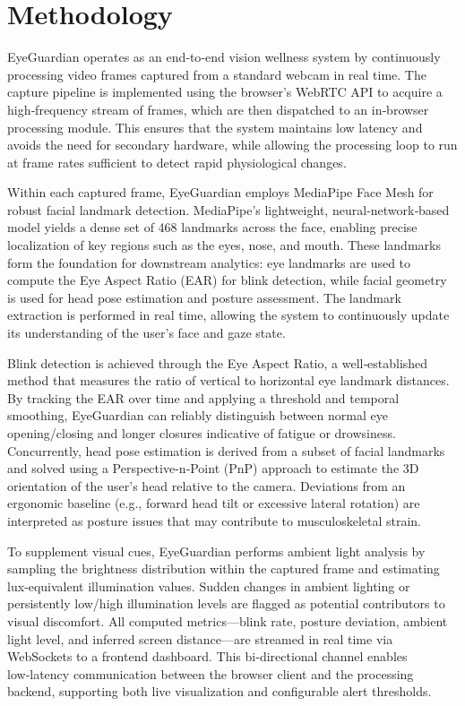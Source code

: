 \documentclass[12pt]{report}
\begin{document}
\section{Methodology}

EyeGuardian operates as an end‑to‑end vision wellness system by continuously processing video frames captured from a standard webcam in real time. The capture pipeline is implemented using the browser’s WebRTC API to acquire a high‑frequency stream of frames, which are then dispatched to an in‑browser processing module. This ensures that the system maintains low latency and avoids the need for secondary hardware, while allowing the processing loop to run at frame rates sufficient to detect rapid physiological changes.

Within each captured frame, EyeGuardian employs MediaPipe Face Mesh for robust facial landmark detection. MediaPipe’s lightweight, neural‑network‑based model yields a dense set of 468 landmarks across the face, enabling precise localization of key regions such as the eyes, nose, and mouth. These landmarks form the foundation for downstream analytics: eye landmarks are used to compute the Eye Aspect Ratio (EAR) for blink detection, while facial geometry is used for head pose estimation and posture assessment. The landmark extraction is performed in real time, allowing the system to continuously update its understanding of the user’s face and gaze state.

Blink detection is achieved through the Eye Aspect Ratio, a well‑established method that measures the ratio of vertical to horizontal eye landmark distances. By tracking the EAR over time and applying a threshold and temporal smoothing, EyeGuardian can reliably distinguish between normal eye opening/closing and longer closures indicative of fatigue or drowsiness. Concurrently, head pose estimation is derived from a subset of facial landmarks and solved using a Perspective‑n‑Point (PnP) approach to estimate the 3D orientation of the user’s head relative to the camera. Deviations from an ergonomic baseline (e.g., forward head tilt or excessive lateral rotation) are interpreted as posture issues that may contribute to musculoskeletal strain.

To supplement visual cues, EyeGuardian performs ambient light analysis by sampling the brightness distribution within the captured frame and estimating lux‑equivalent illumination values. Sudden changes in ambient lighting or persistently low/high illumination levels are flagged as potential contributors to visual discomfort. All computed metrics—blink rate, posture deviation, ambient light level, and inferred screen distance—are streamed in real time via WebSockets to a frontend dashboard. This bi‑directional channel enables low‑latency communication between the browser client and the processing backend, supporting both live visualization and configurable alert thresholds.
\end{document}
